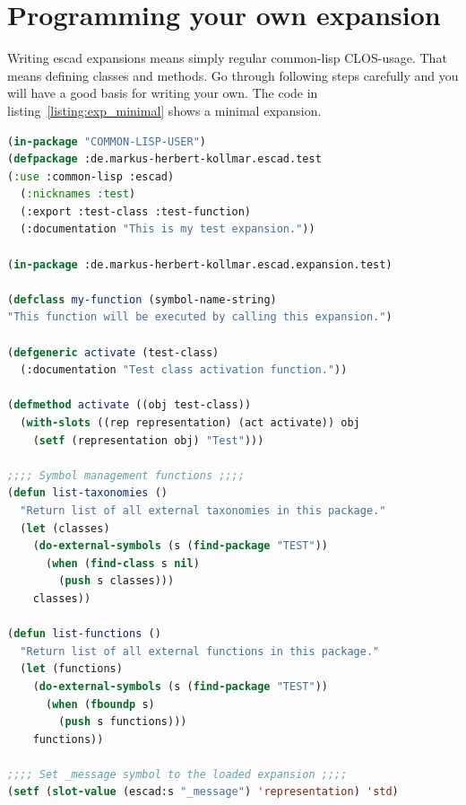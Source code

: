\documentclass[a4paper, 12pt, openany]{scrbook}
\begin{document}
\section{Programming your own expansion}
Writing escad expansions means simply regular common-lisp CLOS-usage. That means defining classes and methods. Go through following steps carefully and you will have a good basis for writing your own. The code in listing~\ref{listing:exp_minimal} shows a minimal expansion.
\begin{lstlisting}[caption={Minimal expansion code of a taxonomy called ``test''.}, language=Lisp, morekeywords={do-external-symbols, find-package, in-package, slot-value, use, with-slots}, label=listing:exp_minimal]
(in-package "COMMON-LISP-USER")
(defpackage :de.markus-herbert-kollmar.escad.test
(:use :common-lisp :escad)
  (:nicknames :test)
  (:export :test-class :test-function)
  (:documentation "This is my test expansion."))
  
(in-package :de.markus-herbert-kollmar.escad.expansion.test)

(defclass my-function (symbol-name-string)
"This function will be executed by calling this expansion.")

(defgeneric activate (test-class)
  (:documentation "Test class activation function."))
  
(defmethod activate ((obj test-class))
  (with-slots ((rep representation) (act activate)) obj
    (setf (representation obj) "Test")))

;;;; Symbol management functions ;;;;
(defun list-taxonomies ()
  "Return list of all external taxonomies in this package."
  (let (classes) 
    (do-external-symbols (s (find-package "TEST"))
      (when (find-class s nil)
        (push s classes)))
    classes))

(defun list-functions ()
  "Return list of all external functions in this package."
  (let (functions) 
    (do-external-symbols (s (find-package "TEST"))
      (when (fboundp s)
        (push s functions)))
    functions))

;;;; Set _message symbol to the loaded expansion ;;;;
(setf (slot-value (escad:s "_message") 'representation) 'std)
\end{lstlisting}
\end{document}
